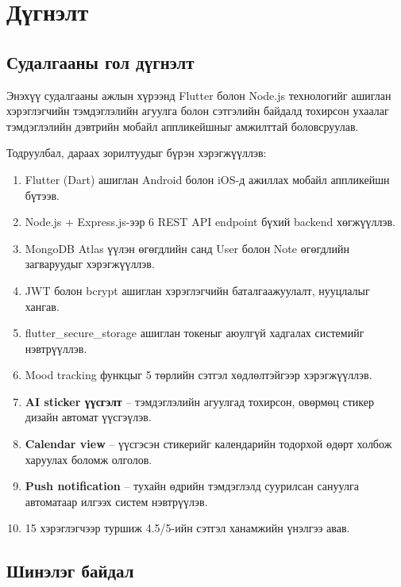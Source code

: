 \chapter{Дүгнэлт}
\label{ch:conclusion}

\section{Судалгааны гол дүгнэлт}

Энэхүү судалгааны ажлын хүрээнд Flutter болон Node.js технологийг ашиглан
хэрэглэгчийн тэмдэглэлийн агуулга болон сэтгэлийн байдалд тохирсон ухаалаг
тэмдэглэлийн дэвтрийн мобайл аппликейшныг амжилттай боловсруулав.

Тодруулбал, дараах зорилтуудыг бүрэн хэрэгжүүллэв:

\begin{enumerate}
  \item Flutter (Dart) ашиглан Android болон iOS-д ажиллах мобайл аппликейшн бүтээв.
  \item Node.js + Express.js-ээр 6 REST API endpoint бүхий backend хөгжүүллэв.
  \item MongoDB Atlas үүлэн өгөгдлийн санд User болон Note өгөгдлийн загваруудыг хэрэгжүүллэв.
  \item JWT болон bcrypt ашиглан хэрэглэгчийн баталгаажуулалт, нууцлалыг хангав.
  \item flutter\_secure\_storage ашиглан токеныг аюулгүй хадгалах системийг нэвтрүүллэв.
  \item Mood tracking функцыг 5 төрлийн сэтгэл хөдлөлтэйгээр хэрэгжүүллэв.
  \item \textbf{AI sticker үүсгэлт} -- тэмдэглэлийн агуулгад тохирсон, овөрмөц стикер дизайн автомат үүсгэүлэв.
  \item \textbf{Calendar view} -- үүсгэсэн стикерийг календарийн тодорхой өдөрт холбож харуулах боломж олголов.
  \item \textbf{Push notification} -- тухайн өдрийн тэмдэглэлд суурилсан сануулга автоматаар илгээх систем нэвтрүүлэв.
  \item 15 хэрэглэгчээр туршиж 4.5/5-ийн сэтгэл ханамжийн үнэлгээ авав.
\end{enumerate}

\section{Шинэлэг байдал}


